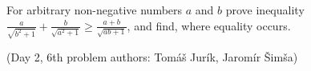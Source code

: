 For arbitrary non-negative numbers $a$ and $b$ prove inequality
$\frac{a}{\sqrt{b^2+1}}+\frac{b}{\sqrt{a^2+1}}\ge\frac{a+b}{\sqrt{ab+1}}$,
and find, where equality occurs.

(Day 2, 6th problem
authors: Tomáš Jurík, Jaromír Šimša)